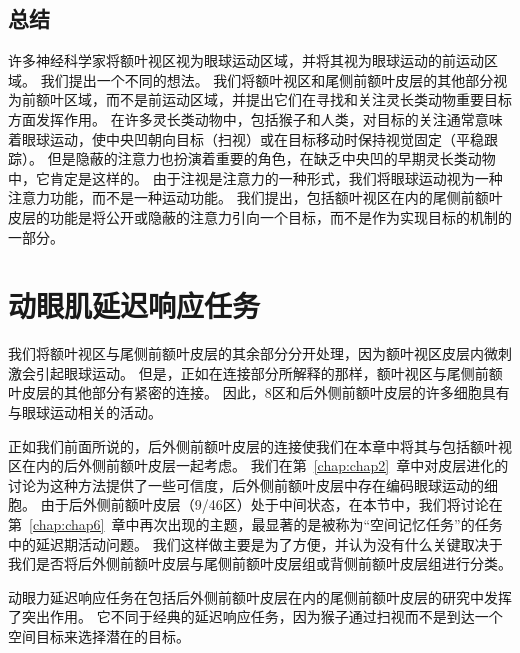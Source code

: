 \subsection{总结}

许多神经科学家将额叶视区视为眼球运动区域，并将其视为眼球运动的前运动区域。
我们提出一个不同的想法。
我们将额叶视区和尾侧前额叶皮层的其他部分视为前额叶区域，而不是前运动区域，并提出它们在寻找和关注灵长类动物重要目标方面发挥作用。
在许多灵长类动物中，包括猴子和人类，对目标的关注通常意味着眼球运动，使中央凹朝向目标（扫视）或在目标移动时保持视觉固定（平稳跟踪）。
但是隐蔽的注意力也扮演着重要的角色，在缺乏中央凹的早期灵长类动物中，它肯定是这样的。
由于注视是注意力的一种形式，我们将眼球运动视为一种注意力功能，而不是一种运动功能。
我们提出，包括额叶视区在内的尾侧前额叶皮层的功能是将公开或隐蔽的注意力引向一个目标，而不是作为实现目标的机制的一部分。



\section{动眼肌延迟响应任务}

我们将额叶视区与尾侧前额叶皮层的其余部分分开处理，因为额叶视区皮层内微刺激会引起眼球运动。
但是，正如在连接部分所解释的那样，额叶视区与尾侧前额叶皮层的其他部分有紧密的连接。
因此，8区\cite{chafee1998matching}和后外侧前额叶皮层\cite{funahashi1989mnemonic}的许多细胞具有与眼球运动相关的活动。


正如我们前面所说的，后外侧前额叶皮层的连接使我们在本章中将其与包括额叶视区在内的后外侧前额叶皮层一起考虑。
我们在第~\ref{chap:chap2}~章中对皮层进化的讨论为这种方法提供了一些可信度，后外侧前额叶皮层中存在编码眼球运动的细胞。
由于后外侧前额叶皮层（9/46区）处于中间状态，在本节中，我们将讨论在第~\ref{chap:chap6}~章中再次出现的主题，最显著的是被称为“空间记忆任务”的任务中的延迟期活动问题。
我们这样做主要是为了方便，并认为没有什么关键取决于我们是否将后外侧前额叶皮层与尾侧前额叶皮层组或背侧前额叶皮层组进行分类。


动眼力延迟响应任务在包括后外侧前额叶皮层在内的尾侧前额叶皮层的研究中发挥了突出作用。
它不同于经典的延迟响应任务，因为猴子通过扫视而不是到达一个空间目标来选择潜在的目标。


